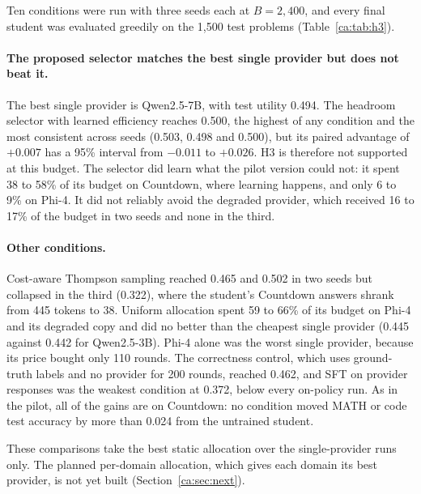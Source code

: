 Ten conditions were run with three seeds each at $B = 2{,}400$, and every final student was
evaluated greedily on the 1,500 test problems (Table~\ref{ca:tab:h3}).



\paragraph{The proposed selector matches the best single provider but does not beat it.}
The best single provider is Qwen2.5-7B, with test utility 0.494. The headroom selector with
learned efficiency reaches 0.500, the highest of any condition and the most consistent
across seeds (0.503, 0.498 and 0.500), but its paired advantage of $+0.007$ has a 95\%
interval from $-0.011$ to $+0.026$. H3 is therefore not supported at this budget. The
selector did learn what the pilot version could not: it spent 38 to 58\% of its budget on
Countdown, where learning happens, and only 6 to 9\% on Phi-4. It did not reliably avoid the
degraded provider, which received 16 to 17\% of the budget in two seeds and none in the third.

\paragraph{Other conditions.} Cost-aware Thompson sampling reached 0.465 and 0.502 in two
seeds but collapsed in the third (0.322), where the student's Countdown answers shrank from
445 tokens to 38. Uniform allocation spent 59 to 66\% of its budget on Phi-4 and its degraded
copy and did no better than the cheapest single provider (0.445 against 0.442 for
Qwen2.5-3B). Phi-4 alone was the worst single provider,
because its price bought only 110 rounds. The correctness control, which uses ground-truth
labels and no provider for 200 rounds, reached 0.462, and SFT on provider responses was the
weakest condition at 0.372, below every on-policy run. As in the pilot, all of the gains are
on Countdown: no condition moved MATH or code test accuracy by more than 0.024 from the
untrained student.

These comparisons take the best static allocation over the single-provider runs only. The
planned per-domain allocation, which gives each domain its best provider, is not yet built
(Section~\ref{ca:sec:next}).
